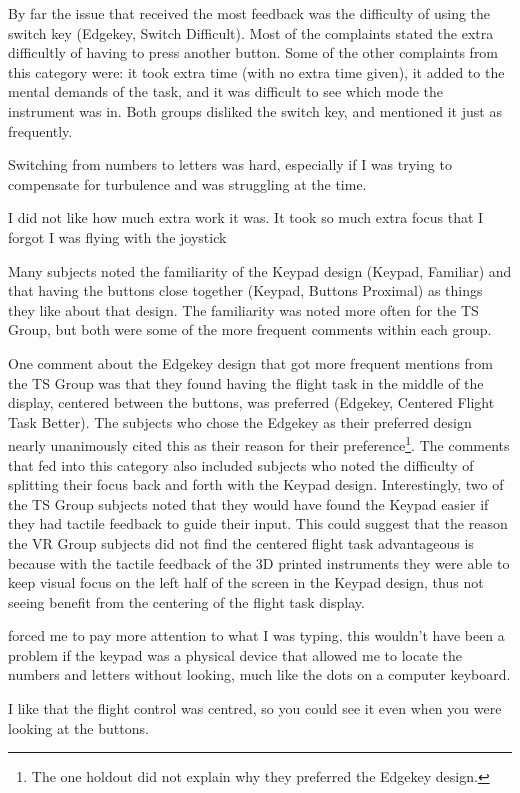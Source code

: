 By far the issue that received the most feedback was the difficulty of using the switch key (Edgekey, Switch Difficult).
Most of the complaints stated the extra difficultly of having to press another button.
Some of the other complaints from this category were: it took extra time (with no extra time given), it added to the mental demands of the task, and it was difficult to see which mode the instrument was in.
Both groups disliked the switch key, and mentioned it just as frequently.
\begin{displayquote}[TS Subject]
    Switching from numbers to letters was hard, especially if I was trying to compensate for turbulence and was struggling at the time.
\end{displayquote}
\begin{displayquote}[VR Subject]
    I did not like how much extra work it was. It took so much extra focus that I forgot I was flying with the joystick
\end{displayquote}

Many subjects noted the familiarity of the Keypad design (Keypad, Familiar) and that having the buttons close together (Keypad, Buttons Proximal) as things they like about that design.
The familiarity was noted more often for the TS Group, but both were some of the more frequent comments within each group.

One comment about the Edgekey design that got more frequent mentions from the TS Group was that they found having the flight task in the middle of the display, centered between the buttons, was preferred (Edgekey, Centered Flight Task Better).
The subjects who chose the Edgekey as their preferred design nearly unanimously cited this as their reason for their preference\footnote{The one holdout did not explain why they preferred the Edgekey design.}.
The comments that fed into this category also included subjects who noted the difficulty of splitting their focus back and forth with the Keypad design.
Interestingly, two of the TS Group subjects noted that they would have found the Keypad easier if they had tactile feedback to guide their input.
This could suggest that the reason the VR Group subjects did not find the centered flight task advantageous is because with the tactile feedback of the 3D printed instruments they were able to keep visual focus on the left half of the screen in the Keypad design, thus not seeing benefit from the centering of the flight task display.
\begin{displayquote}[TS Subject]
     forced me to pay more attention to what I was typing, this wouldn't have been a problem if the keypad was a physical device that allowed me to locate the numbers and letters without looking, much like the dots on a computer keyboard.
\end{displayquote}
\begin{displayquote}[VR Subject]
    I like that the flight control was centred, so you could see it even when you were looking at the buttons.
\end{displayquote}

